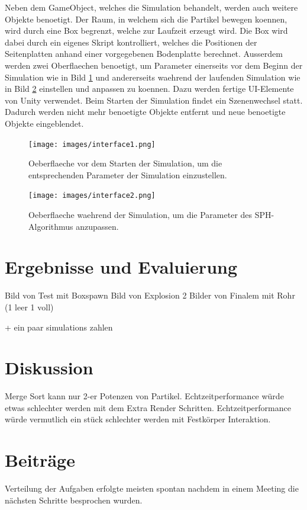 \documentclass[a4paper]{paper}
\begin{document}
Neben dem GameObject, welches die Simulation behandelt, werden auch weitere Objekte benoetigt. Der Raum, in welchem sich die Partikel bewegen koennen, wird durch eine Box begrenzt, welche zur Laufzeit erzeugt wird. Die Box wird dabei durch ein eigenes Skript kontrolliert, welches die Positionen der Seitenplatten anhand einer vorgegebenen Bodenplatte berechnet.
Ausserdem werden zwei Oberflaechen benoetigt, um Parameter einerseits vor dem Beginn der Simulation wie in Bild \ref{fig:interface1} und andererseits waehrend der laufenden Simulation wie in Bild \ref{fig:interface2} einstellen und anpassen zu koennen. Dazu werden fertige UI-Elemente von Unity verwendet. Beim Starten der Simulation findet ein Szenenwechsel statt. Dadurch werden nicht mehr benoetigte Objekte entfernt und neue benoetigte Objekte eingeblendet.

\begin{figure}[t]
    \centering
    \texttt{[image: images/interface1.png]}
    \caption{Oeberflaeche vor dem Starten der Simulation, um die entsprechenden Parameter der Simulation einzustellen.}
    \label{fig:interface1}
\end{figure}

\begin{figure}[t]
    \centering
    \texttt{[image: images/interface2.png]}
    \caption{Oeberflaeche waehrend der Simulation, um die Parameter des SPH-Algorithmus anzupassen.}
    \label{fig:interface2}
\end{figure}

\section{Ergebnisse und Evaluierung}
Bild von Test mit Boxspawn
Bild von Explosion
2 Bilder von Finalem mit Rohr (1 leer 1 voll)

+ ein paar simulations zahlen

\section{Diskussion}
Merge Sort kann nur 2-er Potenzen von Partikel.
Echtzeitperformance würde etwas schlechter werden mit dem Extra Render Schritten.
Echtzeitperformance würde vermutlich ein stück schlechter werden mit Festkörper Interaktion. 

\section{Beiträge}
Verteilung der Aufgaben erfolgte meisten spontan nachdem in einem Meeting die nächsten Schritte besprochen wurden.
\end{document}
